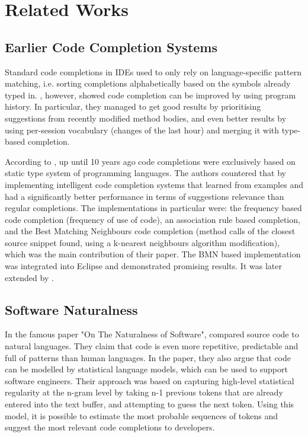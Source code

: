 \chapter{Related Works}
\label{chap:Related Works}

\section{Earlier Code Completion Systems}
Standard code completions in IDEs used to only rely on language-specific pattern matching, i.e. sorting completions alphabetically based on the symbols already typed in. \cite{Robb08a}, however, showed code completion can be improved by using program history. In particular, they managed to get good results by prioritising suggestions from recently modified method bodies, and even better results by using per-session vocabulary (changes of the last hour) and merging it with type-based completion.

According to \cite{Bruc09a}, up until 10 years ago code completions were exclusively based on static type system of programming languages. The authors countered that by implementing intelligent code completion systems that learned from examples and had a significantly better performance in terms of suggestions relevance than regular completions. The implementations in particular were: the frequency based code completion (frequency of use of code), an association rule based completion, and the Best Matching Neighbours code completion (method calls of the closest source snippet found, using a k-nearest neighbours algorithm modification), which was the main contribution of their paper. The BMN based implementation was integrated into Eclipse and demonstrated promising results. It was later extended by \cite{Prok15a}.

\section{Software Naturalness}
In the famous paper "On The Naturalness of Software", \cite{Hind12a} compared source code to natural languages. They claim that code is even more repetitive, predictable and full of patterns than human languages. In the paper, they also argue that code can be modelled by statistical language models, which can be used to support software engineers. Their approach was based on capturing high-level statistical regularity at the n-gram level by taking n-1 previous tokens that are already entered into the text buffer, and attempting to guess the next token. Using this model, it is possible to estimate the most probable sequences of tokens and suggest the most relevant code completions to developers.

